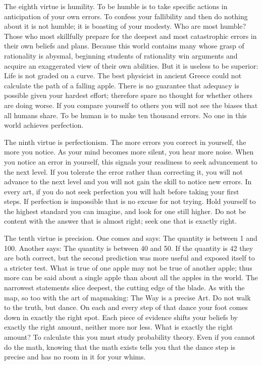 {
 The eighth virtue is humility. To be humble is to take specific
actions in anticipation of your own errors. To confess your fallibility
and then do nothing about it is not humble; it is boasting of your
modesty. Who are most humble? Those who most skillfully prepare for the
deepest and most catastrophic errors in their own beliefs and plans.
Because this world contains many whose grasp of rationality is abysmal,
beginning students of rationality win arguments and acquire an
exaggerated view of their own abilities. But it is useless to be
superior: Life is not graded on a curve. The best physicist in ancient
Greece could not calculate the path of a falling apple. There is no
guarantee that adequacy is possible given your hardest effort;
therefore spare no thought for whether others are doing worse. If you
compare yourself to others you will not see the biases that all humans
share. To be human is to make ten thousand errors. No one in this world
achieves perfection.}

{
 The ninth virtue is perfectionism. The more errors you correct in
yourself, the more you notice. As your mind becomes more silent, you
hear more noise. When you notice an error in yourself, this signals
your readiness to seek advancement to the next level. If you tolerate
the error rather than correcting it, you will not advance to the next
level and you will not gain the skill to notice new errors. In every
art, if you do not seek perfection you will halt before taking your
first steps. If perfection is impossible that is no excuse for not
trying. Hold yourself to the highest standard you can imagine, and look
for one still higher. Do not be content with the answer that is almost
right; seek one that is exactly right.}

{
 The tenth virtue is precision. One comes and says: The quantity is
between 1 and 100. Another says: The quantity is between 40 and 50. If
the quantity is 42 they are both correct, but the second prediction was
more useful and exposed itself to a stricter test. What is true of one
apple may not be true of another apple; thus more can be said about a
single apple than about all the apples in the world. The narrowest
statements slice deepest, the cutting edge of the blade. As with the
map, so too with the art of mapmaking: The Way is a precise Art. Do not
walk to the truth, but dance. On each and every step of that dance your
foot comes down in exactly the right spot. Each piece of evidence
shifts your beliefs by exactly the right amount, neither more nor less.
What is exactly the right amount? To calculate this you must study
probability theory. Even if you cannot do the math, knowing that the
math exists tells you that the dance step is precise and has no room in
it for your whims.}

